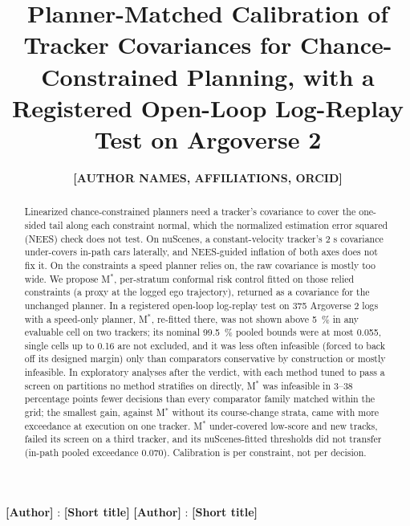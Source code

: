 \documentclass{ieeeaccess}
\begin{document}

\title{Planner-Matched Calibration of Tracker Covariances for Chance-Constrained Planning, with a Registered Open-Loop Log-Replay Test on Argoverse 2}
\author{\uppercase{\textbf{[Author names, affiliations, ORCID]}}}
\address[1]{\textbf{[Affiliation, postal address and e-mail of each author; ORCID iDs]}}

\markboth
{\textbf{[Author]} \headeretal: \textbf{[Short title]}}
{\textbf{[Author]} \headeretal: \textbf{[Short title]}}


\begin{abstract}
Linearized chance-constrained planners need a tracker's covariance to cover the one-sided tail along each constraint normal, which the normalized estimation error squared (NEES) check does not test. On nuScenes, a constant-velocity tracker's 2 s covariance under-covers in-path cars laterally, and NEES-guided inflation of both axes does not fix it. On the constraints a speed planner relies on, the raw covariance is mostly too wide. We propose M$^{*}$, per-stratum conformal risk control fitted on those relied constraints (a proxy at the logged ego trajectory), returned as a covariance for the unchanged planner. In a registered open-loop log-replay test on 375 Argoverse 2 logs with a speed-only planner, M$^{*}$, re-fitted there, was not shown above 5~\% in any evaluable cell on two trackers; its nominal 99.5~\% pooled bounds were at most 0.055, single cells up to 0.16 are not excluded, and it was less often infeasible (forced to back off its designed margin) only than comparators conservative by construction or mostly infeasible. In exploratory analyses after the verdict, with each method tuned to pass a screen on partitions no method stratifies on directly, M$^{*}$ was infeasible in 3--38 percentage points fewer decisions than every comparator family matched within the grid; the smallest gain, against M$^{*}$ without its course-change strata, came with more exceedance at execution on one tracker. M$^{*}$ under-covered low-score and new tracks, failed its screen on a third tracker, and its nuScenes-fitted thresholds did not transfer (in-path pooled exceedance 0.070). Calibration is per constraint, not per decision.
\end{abstract}
\end{document}
